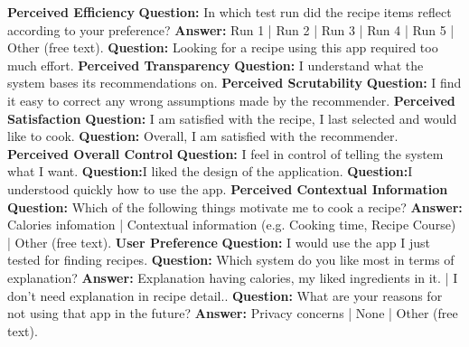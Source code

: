 \textbf{Perceived Efficiency}\newline
\textbf{Question:} In which test run did the recipe items reflect according to your preference?\newline 
\textbf{Answer:} Run 1 | Run 2 | Run 3 | Run 4 | Run 5 | Other  (free text).\newline \newline
\textbf{Question:} Looking for a recipe using this app required too much effort.\newline \newline
\textbf{Perceived Transparency}\newline
\textbf{Question:} I understand what the system bases its recommendations on.\newline \newline
\textbf{Perceived Scrutability}\newline
\textbf{Question:} I find it easy to correct any wrong assumptions made by the recommender.\newline \newline
\textbf{Perceived Satisfaction}\newline
\textbf{Question:} I am satisfied with the recipe, I last selected and would like to cook.\newline 
\textbf{Question:} Overall, I am satisfied with the recommender.\newline \newline
\textbf{Perceived Overall Control}\newline
\textbf{Question:} I feel in control of telling the system what I want.\newline
\textbf{Question:}I liked the design of the application.\newline
\textbf{Question:}I understood quickly how to use the app.\newline \newline
\textbf{Perceived Contextual Information}\newline
\textbf{Question:} Which of the following things motivate me to cook a recipe?\newline
\textbf{Answer:} Calories infomation | Contextual information (e.g. Cooking time, Recipe Course) | Other  (free text).\newline \newline
\textbf{User Preference}\newline
\textbf{Question:} I would use the app I just tested for finding recipes. \newline 
\textbf{Question:} Which system do you like most in terms of explanation? \newline
\textbf{Answer:} Explanation having calories, my liked ingredients in it. | I don't need explanation in recipe detail..\newline
\textbf{Question:} What are your reasons for not using that app in the future? \newline
\textbf{Answer:} Privacy concerns | None | Other  (free text).

